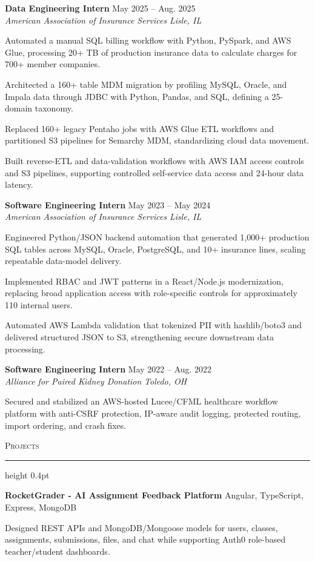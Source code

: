 \documentclass[letterpaper,11pt]{article}
\newcommand{\resumesection}[1]{%
  \par\vspace{2pt}%
  {\large\scshape #1}\par\vspace{2pt}%
  \hrule height 0.4pt\vspace{2pt}%
}
\newcommand{\resumeSubheading}[4]{
  \textbf{#1} \hfill #2\\
  \textit{#3} \hfill \textit{#4}
}
\newcommand{\projectHeading}[2]{
  \textbf{#1} \hfill #2
}
\begin{document}
\resumeSubheading
{Data Engineering Intern}{May 2025 -- Aug. 2025}
{American Association of Insurance Services}{Lisle, IL}
\begin{tightitemize}
  \item Automated a manual SQL billing workflow with Python, PySpark, and AWS Glue, processing 20+ TB of production insurance data to calculate charges for 700+ member companies.
  \item Architected a 160+ table MDM migration by profiling MySQL, Oracle, and Impala data through JDBC with Python, Pandas, and SQL, defining a 25-domain taxonomy.
  \item Replaced 160+ legacy Pentaho jobs with AWS Glue ETL workflows and partitioned S3 pipelines for Semarchy MDM, standardizing cloud data movement.
  \item Built reverse-ETL and data-validation workflows with AWS IAM access controls and S3 pipelines, supporting controlled self-service data access and 24-hour data latency.
\end{tightitemize}

\resumeSubheading
{Software Engineering Intern}{May 2023 -- May 2024}
{American Association of Insurance Services}{Lisle, IL}
\begin{tightitemize}
  \item Engineered Python/JSON backend automation that generated 1,000+ production SQL tables across MySQL, Oracle, PostgreSQL, and 10+ insurance lines, scaling repeatable data-model delivery.
  \item Implemented RBAC and JWT patterns in a React/Node.js modernization, replacing broad application access with role-specific controls for approximately 110 internal users.
  \item Automated AWS Lambda validation that tokenized PII with hashlib/boto3 and delivered structured JSON to S3, strengthening secure downstream data processing.
\end{tightitemize}

\resumeSubheading
{Software Engineering Intern}{May 2022 -- Aug. 2022}
{Alliance for Paired Kidney Donation}{Toledo, OH}
\begin{tightitemize}
  \item Secured and stabilized an AWS-hosted Lucee/CFML healthcare workflow platform with anti-CSRF protection, IP-aware audit logging, protected routing, import ordering, and crash fixes.
\end{tightitemize}

\resumesection{Projects}
\projectHeading{RocketGrader - AI Assignment Feedback Platform}{Angular, TypeScript, Express, MongoDB}
\begin{tightitemize}
  \item Designed REST APIs and MongoDB/Mongoose models for users, classes, assignments, submissions, files, and chat while supporting Auth0 role-based teacher/student dashboards.
\end{tightitemize}
\end{document}

